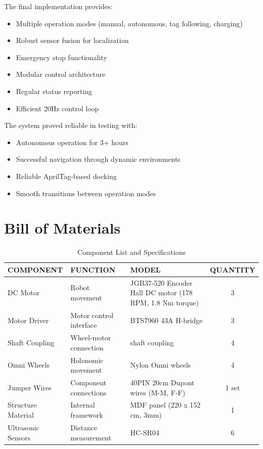 \documentclass{article}
\begin{document}
The final implementation provides:
\begin{itemize}
    \item Multiple operation modes (manual, autonomous, tag following, charging)
    \item Robust sensor fusion for localization
    \item Emergency stop functionality
    \item Modular control architecture
    \item Regular status reporting
    \item Efficient 20Hz control loop
\end{itemize}

The system proved reliable in testing with:
\begin{itemize}
    \item Autonomous operation for 3+ hours
    \item Successful navigation through dynamic environments
    \item Reliable AprilTag-based docking
    \item Smooth transitions between operation modes
\end{itemize}

\newpage
\section{Bill of Materials}
\begin{table}[ht]
\centering
\begin{tabular}{|>{\raggedright\arraybackslash}p{4cm}|>{\raggedright\arraybackslash}p{3cm}|>{\raggedright\arraybackslash}p{6cm}|c|}
\hline
\textbf{COMPONENT} & \textbf{FUNCTION} & \textbf{MODEL} & \textbf{QUANTITY} \\ \hline
DC Motor & Robot movement & JGB37-520 Encoder Hall DC motor (178 RPM, 1.8 Nm torque) & 3 \\ \hline
Motor Driver & Motor control interface & BTS7960 43A H-bridge & 3 \\ \hline
Shaft Coupling & Wheel-motor connection & 6mm shaft coupling & 4 \\ \hline
Omni Wheels & Holonomic movement & 58mm Nylon Omni wheels & 4 \\ \hline
Jumper Wires & Component connections & 40PIN 20cm Dupont wires (M-M, F-F) & 1 set \\ \hline
Structure Material & Internal framework & MDF panel (220 x 152 cm, 3mm) & 1 \\ \hline
Ultrasonic Sensors & Distance measurement & HC-SR04 & 6 \\ \hline
\end{tabular}
\caption{Component List and Specifications}
\label{tab:components}
\end{table}
\end{document}
